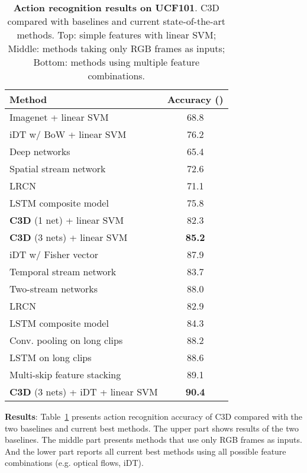\documentclass[10pt,twocolumn,letterpaper]{article}
\begin{document}
\begin{table}
\begin{center}

\begin{tabular}{|l|c|}
\hline
Method & Accuracy () \\
\hline
Imagenet + linear SVM & 68.8 \\
iDT w/ BoW + linear SVM & 76.2 \\
\hline
Deep networks~\cite{Karpathy14} & 65.4 \\
Spatial stream network~\cite{SimonyanZ14} & 72.6 \\
LRCN~\cite{DonahueHGRVSD14} & 71.1 \\
LSTM composite model~\cite{SrivastavaMS15} & 75.8 \\
{\bf C3D} (1 net) + linear SVM & 82.3 \\
{\bf C3D} (3 nets) + linear SVM & {\bf 85.2} \\
\hline
iDT w/ Fisher vector~\cite{PengWWQ14} & 87.9\\
Temporal stream network~\cite{SimonyanZ14} & 83.7 \\
Two-stream networks~\cite{SimonyanZ14} & 88.0 \\
LRCN~\cite{DonahueHGRVSD14} & 82.9 \\
LSTM composite model~\cite{SrivastavaMS15} & 84.3 \\
Conv. pooling on long clips~\cite{Ng15} & 88.2 \\
LSTM on long clips~\cite{Ng15} & 88.6 \\
Multi-skip feature stacking~\cite{LanLLHR14} & 89.1 \\
{\bf C3D} (3 nets) + iDT + linear SVM& {\bf 90.4} \\
\hline
\end{tabular}
\end{center}
\vspace{-8pt}
\caption{{\bf Action recognition results on UCF101}. C3D compared with baselines and current state-of-the-art methods. Top: simple features with linear SVM; Middle: methods taking only RGB frames as inputs; Bottom: methods using multiple feature combinations.}
\label{tab:ucf101_result_combine}
\end{table}

{\bf Results}: Table~\ref{tab:ucf101_result_combine} presents action recognition accuracy of C3D compared with the two baselines and current best methods. The upper part shows results of the two baselines. The middle part presents methods that use only RGB frames as inputs. And the lower part reports all current best methods using all possible feature combinations (e.g. optical flows, iDT).
\end{document}
